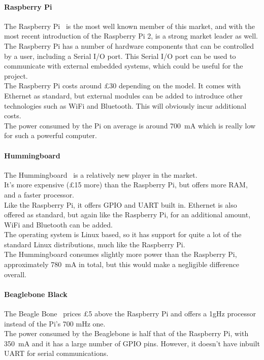 \documentclass[draft,preprint,12pt,3p]{elsarticle}
\begin{document}
\paragraph{Raspberry Pi}
The Raspberry Pi~\cite{raspberrypi} is the most well known member of this market, and with the most recent introduction of the Raspberry Pi 2, is a strong market leader as well.\\
The Raspberry Pi has a number of hardware components that can be controlled by a user, including a Serial I/O port. This Serial I/O port can be used to communicate with external embedded systems, which could be useful for the project.\\
The Raspberry Pi costs around \pounds30 depending on the model. It comes with Ethernet as standard, but external modules can be added to introduce other technologies such as WiFi and Bluetooth. This will obviously incur additional costs.\\
The power consumed by the Pi on average is around \SI{700}{\milli\ampere} which is really low for such a powerful computer.

\paragraph{Hummingboard}
The Hummingboard~\cite{hummingboard} is a relatively new player in the market.\\
It's more expensive (\pounds15 more) than the Raspberry Pi, but offers more RAM, and a faster processor.\\
Like the Raspberry Pi, it offers GPIO and UART built in. Ethernet is also offered as standard, but again like the Raspberry Pi, for an additional amount, WiFi and Bluetooth can be added.\\
The operating system is Linux based, so it has support for quite a lot of the standard Linux distributions, much like the Raspberry Pi.\\
The Hummingboard consumes slightly more power than the Raspberry Pi, approximately \SI{780}{\milli\ampere} in total, but this would make a negligible difference overall.
\paragraph{Beaglebone Black}
The Beagle Bone~\cite{beaglebone} prices \pounds5 above the Raspberry Pi and offers a 1gHz processor instead of the Pi's 700 mHz one.\\

The power consumed by the Beaglebone is half that of the Raspberry Pi, with \SI{350}{\milli\ampere} and it has a large number of GPIO pins. However, it doesn't have inbuilt UART for serial communications.\\
\end{document}
